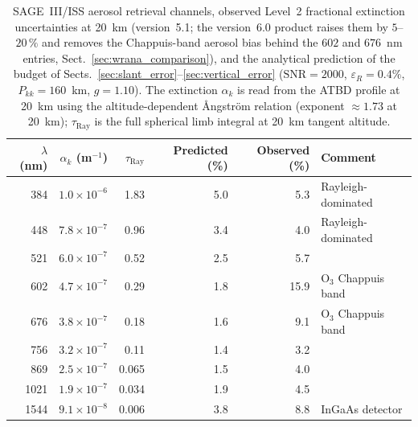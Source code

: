 \begin{table}[t]
    \centering
    \caption{SAGE~III/ISS aerosol retrieval channels, observed Level~2
             fractional extinction uncertainties at 20~km \citep{Wrana2021} (version~5.1; the version~6.0 product raises them by $5$--$20\,\%$ and removes the Chappuis-band aerosol bias behind the $602$ and $676$~nm entries, Sect.~\ref{sec:wrana_comparison}),
             and the analytical prediction of the budget of Sects.~\ref{sec:slant_error}--\ref{sec:vertical_error}
             ($\mathrm{SNR}=2000$, $\varepsilon_R=0.4\%$, $P_{kk}=160$~km, $g=1.10$).
             The extinction $\alpha_k$ is read from the ATBD profile at
             20~km using the altitude-dependent \r{A}ngstr\"om relation
             (exponent $\approx 1.73$ at 20~km); $\tau_\mathrm{Ray}$ is the
             full spherical limb integral at 20~km tangent altitude.}
    \label{tab:combined}
    \begin{tabular}{rrrrrl}
        \toprule
        $\lambda$ (nm) & $\alpha_k$ (m$^{-1}$) & $\tau_\mathrm{Ray}$ &
        Predicted (\%) & Observed (\%) & Comment \\
        \midrule
        384  & $1.0\times10^{-6}$ & 1.83 &  5.0 & 5.3  & Rayleigh-dominated \\
        448  & $7.8\times10^{-7}$ & 0.96 &  3.4 & 4.0  & Rayleigh-dominated \\
        521  & $6.0\times10^{-7}$ & 0.52 &  2.5 & 5.7  & \\
        602  & $4.7\times10^{-7}$ & 0.29 &  1.8 & 15.9 & O$_3$ Chappuis band \\
        676  & $3.8\times10^{-7}$ & 0.18 &  1.6 & 9.1  & O$_3$ Chappuis band \\
        756  & $3.2\times10^{-7}$ & 0.11 &  1.4 & 3.2  & \\
        869  & $2.5\times10^{-7}$ & 0.065&  1.5 & 4.0  & \\
        1021 & $1.9\times10^{-7}$ & 0.034&  1.9 & 4.5  & \\
        1544 & $9.1\times10^{-8}$ & 0.006&  3.8 & 8.8  & InGaAs detector \\
        \bottomrule
    \end{tabular}
\end{table}
